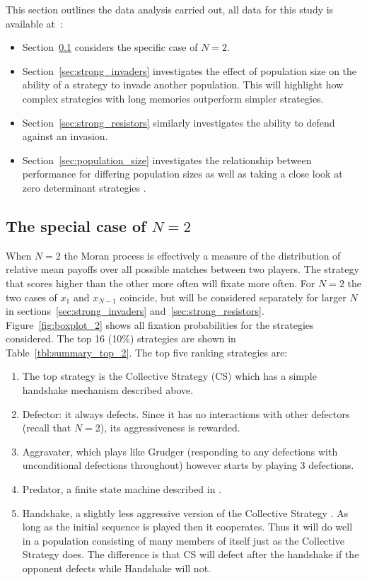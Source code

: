 \documentclass[10pt,journal]{IEEEtran}
\begin{document}
This section outlines the data analysis carried out, all data for this study is
available at~\cite{data}:

\begin{itemize}
    \item Section~\ref{sec:two_individuals} considers the specific case of
        \(N=2\).
    \item Section~\ref{sec:strong_invaders} investigates the effect of
        population size on the ability of a strategy to invade another
        population. This will highlight how complex strategies with long
        memories outperform simpler strategies.
    \item Section~\ref{sec:strong_resistors} similarly investigates the
        ability to defend against an invasion.
    \item Section~\ref{sec:population_size} investigates the relationship
        between performance for differing population sizes as well as
        taking a close look at zero determinant strategies \cite{Press2012}.
\end{itemize}

\subsection{The special case of \(N=2\)}\label{sec:two_individuals}

When $N=2$ the Moran process is effectively a measure of the distribution of relative
mean payoffs over all possible matches between two players. The strategy
that scores higher than the other more often will fixate more often. For \(N=2\)
the two cases of \(x_1\) and \(x_{N-1}\) coincide, but will be
considered separately for larger \(N\) in sections~\ref{sec:strong_invaders}
and~\ref{sec:strong_resistors}. Figure~\ref{fig:boxplot_2} shows all fixation
probabilities for the strategies considered. The top 16 (10\%) strategies are
shown in
Table~\ref{tbl:summary_top_2}. The top five ranking strategies are:

\begin{enumerate}
    \item The top strategy is the Collective Strategy (CS) which has a simple
        handshake mechanism described above.
    \item Defector: it always defects. Since it has no interactions with other
        defectors (recall that \(N=2\)), its aggressiveness is rewarded.
    \item Aggravater, which plays like Grudger (responding to any
        defections with unconditional defections throughout) however starts by
        playing 3 defections.
    \item Predator, a finite state machine described in \cite{Ashlock2006}.
    \item Handshake, a slightly less aggressive version of the Collective
        Strategy \cite{robson1989}. As long as the initial sequence is played
        then it cooperates. Thus it will do well in a population consisting of
        many members of itself just as the Collective Strategy does. The
        difference is that CS will defect after the handshake if the opponent
        defects while Handshake will not.
\end{enumerate}
\end{document}
